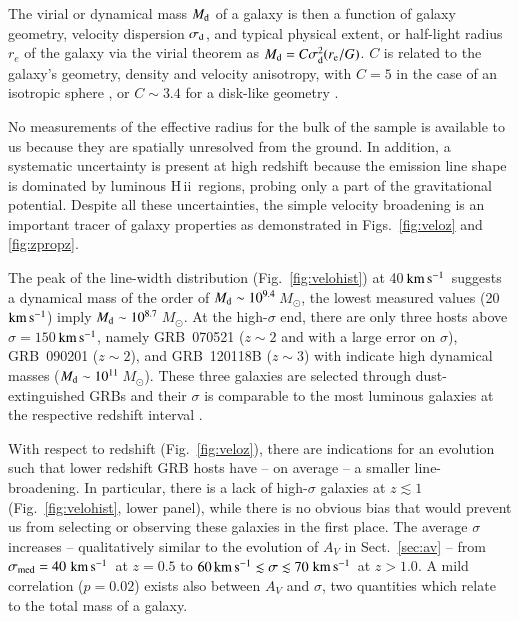 \documentclass[traditabstract, longauth]{aa}
\newcommand{\kms}{$\rm{km\,s^{-1}}$}
\newcommand{\hii}{\mbox{H\,{\sc ii}}}
\newcommand{\Msun}{$M_\odot$}
\begin{document}
The virial or dynamical mass $M_{\rm{d}}$ of a galaxy is then a function of galaxy geometry, velocity dispersion $\sigma_{\rm{d}}$, and typical physical extent, or half-light radius $r_{e}$ of the galaxy via the virial theorem \citep[see e.g.,][]{2001ApJ...554..981P} as $M_{\rm{d}} = C\sigma_{\rm{d}}^2(r_{\rm{e}}/G)$. $C$ is related to the galaxy's geometry, density and velocity anisotropy, with $C=5$ in the case of an isotropic sphere \citep{2001ApJ...554..981P}, or $C\sim3.4$ for a disk-like geometry \citep{2006ApJ...646..107E}.

No measurements of the effective radius for the bulk of the sample is available to us because they are spatially unresolved from the ground.  {In addition, a systematic uncertainty is present at high redshift because the emission line shape is dominated by luminous \hii\, regions, probing only a part of the gravitational potential. Despite all these uncertainties, the simple velocity broadening is an important tracer of galaxy properties as demonstrated in Figs.~\ref{fig:veloz} and \ref{fig:zpropz}.} 

The peak of the line-width distribution (Fig.~\ref{fig:velohist}) at 40\,\kms\, suggests a dynamical mass of the order of $M_{\rm{d}} \sim 10^{9.4}$\,\Msun, the lowest measured values (20\,\kms) imply $M_{\rm{d}} \sim 10^{8.7}$\,\Msun. At the high-$\sigma$ end, there are only three hosts above $\sigma=150$\,\kms, namely GRB~070521 ($z\sim2$ and with a large error on $\sigma$), GRB~090201 ($z\sim2$), and GRB~120118B ($z\sim3$) with indicate high dynamical masses ($M_{\rm{d}} \sim 10^{11}$\,\Msun). These three galaxies are selected through dust-extinguished GRBs and their $\sigma$ is comparable to the most luminous galaxies at the respective redshift interval \citep[e.g.,][]{2006ApJ...646..107E}.

With respect to redshift (Fig.~\ref{fig:veloz}), there are indications for an evolution such that lower redshift GRB hosts have -- on average -- a smaller line-broadening. In particular, there is a lack of high-$\sigma$ galaxies at $z\lesssim1$ (Fig.~\ref{fig:velohist}, lower panel), while there is no obvious bias that would prevent us from selecting or observing these galaxies in the first place. The average $\sigma$ increases -- qualitatively similar to the evolution of $A_V$ in Sect.~\ref{sec:av} -- from $\sigma_{\rm{med}}=40\,$\kms\, at $z=0.5$ to $60\,\rm{km\,s^{-1}}\lesssim \sigma \lesssim 70\,$\kms\, at $z>1.0$. A mild correlation ($p=0.02$) exists also between $A_V$ and $\sigma$, two quantities which relate to the total mass of a galaxy.
 
\end{document}
